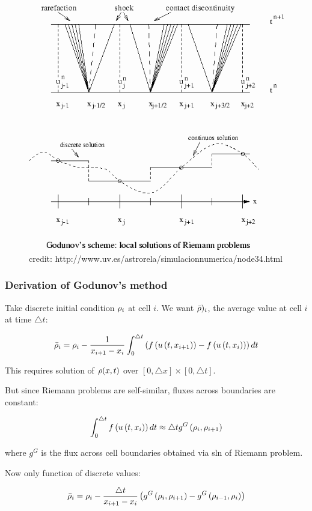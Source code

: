 \begin{frame}



\begin{figure}
\includegraphics[width=.65\columnwidth]{images/godunov}
\caption{credit: http://www.uv.es/astrorela/simulacionnumerica/node34.html}
\end{figure}


\end{frame}

\begin{frame}
\frametitle{Derivation of Godunov's method}

Take discrete initial condition $\rho_i$ at cell $i$. We want $\bar{\rho})_i$, the average value at cell $i$ at time $\triangle t$:

\begin{equation}
    \bar{\rho}_{i}=\rho_{i}-\frac{1}{x_{i+1}-x_{i}}\int_{0}^{\triangle t}\left(f\left(u\left(t,x_{i+1}\right)\right)-f\left(u\left(t,x_{i}\right)\right)\right)dt
\end{equation}


This requires solution of $\rho(x,t)$ over $[0,\triangle x]\times [0,\triangle t]$. 


But since Riemann problems are self-similar, fluxes across boundaries are constant:

\begin{equation}
    \int_{0}^{\triangle t}f\left(u\left(t,x_{i}\right)\right)dt\approx\triangle tg^{G}\left(\rho_{i},\rho_{i+1}\right)
\end{equation}

where $g^G$ is the flux across cell boundaries obtained via sln of Riemann problem.

Now only function of discrete values:

\begin{equation}
\bar{\rho}_{i}=\rho_{i}-\frac{\triangle t}{x_{i+1}-x_{i}}\left(g^{G}\left(\rho_{i},\rho_{i+1}\right)-g^{G}\left(\rho_{i-1},\rho_{i}\right)\right)    
\end{equation}


\end{frame}

